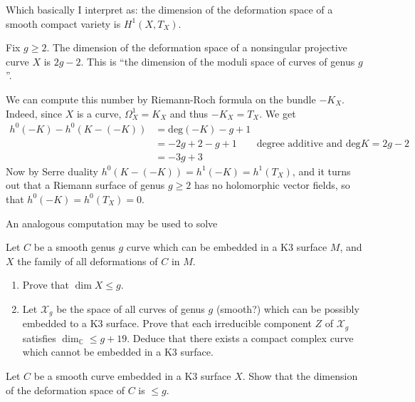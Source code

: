 Which basically I interpret as: the dimension of the deformation space of a
smooth compact variety is $H^{1}(X,T_X)$.

\begin{example}
\label{example-moduli-space-of-nonsingular-Riemann-surfaces-of-genus-g}
\begin{reference}
\cite[Example 3.1]{continued-fractions}
\end{reference}
Fix $g \geq 2$. The dimension of the deformation space of a nonsingular
projective curve $X$ is $2g-2$. This is ``the dimension of the moduli space of
curves of genus $g$''.
 
We can compute this number by Riemann-Roch formula on the bundle $-K_X$. 
Indeed, since $X$ is a curve, $\Omega_X^1=K_X$ and thus $-K_X=T_X$. We get
\begin{align*}
h^0(-K)-h^0(K-(-K))&=\text{deg}(-K)-g+1\\
&=-2g+2-g+1\qquad \text{degree additive and $\text{deg}K=2g-2$}\\
&=-3g+3
\end{align*}
Now by Serre duality $h^0(K-(-K))=h^1(-K)=h^1(T_X)$, and it turns out that a
Riemann surface of genus $g \geq 2$ has no holomorphic vector fields, so that
$h^0(-K)=h^0(T_X)=0$.
\end{example}

An analogous computation may be used to solve

\begin{exercise}
\label{exercise-deformations-of-curves-in-K3}
Let $C$ be a smooth genus $g$ curve which can be embedded in a K3 surface  $M$,
and $X$ the family of all deformations of $C$ in $M$.
\begin{enumerate}
\item Prove that $\dim X \leq  g$.
\item Let $\mathcal{X}_g$ be the space of all curves of genus $g$ (smooth?)
which can be possibly embedded to a K3 surface. Prove that each irreducible
component $Z$ of $\mathcal{X}_g$ satisfies $\dim_\mathbb{C} \leq  g+19$. Deduce
that there exists a compact complex curve which cannot be embedded in a K3
surface.
\end{enumerate}
\end{exercise}

\begin{exercise}
\label{exercise-}
Let $C$ be a smooth curve embedded in a K3 surface $X$. Show that the dimension
of the deformation space of $C$ is $\leq g$.
\end{exercise}

